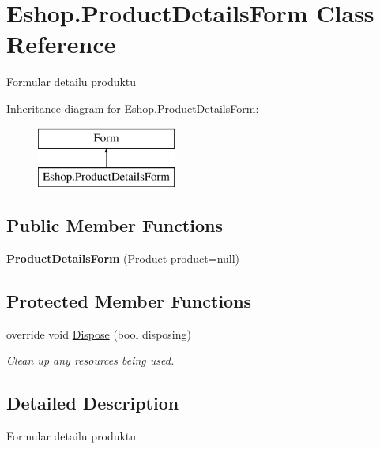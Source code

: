 \hypertarget{class_eshop_1_1_product_details_form}{}\section{Eshop.\+Product\+Details\+Form Class Reference}
\label{class_eshop_1_1_product_details_form}


Formular detailu produktu  


Inheritance diagram for Eshop.\+Product\+Details\+Form\+:\begin{figure}[H]
\begin{center}
\leavevmode
\includegraphics[height=2.000000cm]{class_eshop_1_1_product_details_form}
\end{center}
\end{figure}
\subsection*{Public Member Functions}
\begin{DoxyCompactItemize}
\item 
\mbox{\label{class_eshop_1_1_product_details_form_ade91b686ea35d5b709c9b92a5a0a9a08}} 
{\bfseries Product\+Details\+Form} (\mbox{\hyperlink{class_eshop_1_1_product}{Product}} product=null)
\end{DoxyCompactItemize}
\subsection*{Protected Member Functions}
\begin{DoxyCompactItemize}
\item 
override void \mbox{\hyperlink{class_eshop_1_1_product_details_form_abf50712acc78a5094ac44d57ba33c3b3}{Dispose}} (bool disposing)
\begin{DoxyCompactList}\small\item\em Clean up any resources being used. \end{DoxyCompactList}\end{DoxyCompactItemize}


\subsection{Detailed Description}
Formular detailu produktu 



